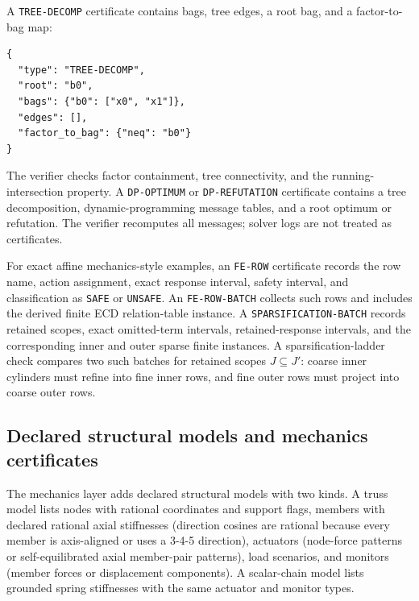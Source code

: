 A \texttt{TREE-DECOMP} certificate contains bags, tree edges, a root bag, and a
factor-to-bag map:
\begin{verbatim}
{
  "type": "TREE-DECOMP",
  "root": "b0",
  "bags": {"b0": ["x0", "x1"]},
  "edges": [],
  "factor_to_bag": {"neq": "b0"}
}
\end{verbatim}
The verifier checks factor containment, tree connectivity, and the
running-intersection property. A \texttt{DP-OPTIMUM} or \texttt{DP-REFUTATION}
certificate contains a tree decomposition, dynamic-programming message tables,
and a root optimum or refutation. The verifier recomputes all messages; solver
logs are not treated as certificates.

For exact affine mechanics-style examples, an \texttt{FE-ROW} certificate records
the row name, action assignment, exact response interval, safety interval, and
classification as \texttt{SAFE} or \texttt{UNSAFE}. An \texttt{FE-ROW-BATCH}
collects such rows and includes the derived finite ECD relation-table instance.
A \texttt{SPARSIFICATION-BATCH} records retained scopes, exact omitted-term
intervals, retained-response intervals, and the corresponding inner and outer
sparse finite instances. A sparsification-ladder check compares two such batches
for retained scopes $J\subseteq J'$: coarse inner cylinders must refine into fine
inner rows, and fine outer rows must project into coarse outer rows.

\subsection{Declared structural models and mechanics certificates}

The mechanics layer adds declared structural models with two kinds. A truss
model lists nodes with rational coordinates and support flags, members with
declared rational axial stiffnesses (direction cosines are rational because
every member is axis-aligned or uses a 3-4-5 direction), actuators (node-force
patterns or self-equilibrated axial member-pair patterns), load scenarios, and
monitors (member forces or displacement components). A scalar-chain model lists
grounded spring stiffnesses with the same actuator and monitor types.

